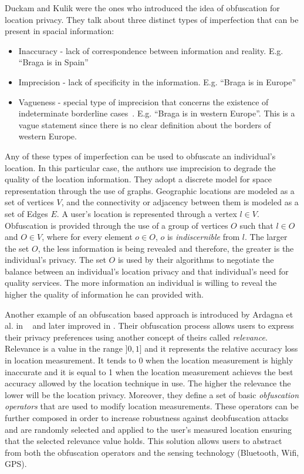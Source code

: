Duckam and Kulik
\cite{duckham2005formal} were the ones who introduced the idea of
obfuscation for location privacy. They talk about three distinct types of
imperfection that can be present in spacial information:
\begin{itemize}
\item Inaccuracy - lack of correspondence between information and
  reality. E.g. ``Braga is in Spain''
\item Imprecision - lack of specificity in the information. E.g.
  ``Braga is in Europe''
\item Vagueness - special type of imprecision that concerns the
  existence of indeterminate borderline
  cases~\cite{duckham2001formal}. E.g. ``Braga is in western Europe''.
  This is a vague statement since there is no clear definition about
  the borders of western Europe.
\end{itemize}

Any of these types of imperfection can be used to obfuscate an
individual's location. In this particular case, the authors use
imprecision to degrade the quality of the location information.
They adopt a discrete model for space representation through the use of
graphs. Geographic locations are modeled as a set of vertices $V$, and
the connectivity or adjacency between them is modeled as a set of
Edges $E$. A user's location is represented through a
vertex $l \in V$. Obfuscation is provided through the use of a group
of vertices $O$ such that $l \in O$ and $O \in V$, where for every
element $o \in O$, $o$ is \emph{indiscernible} from $l$. The larger
the set $O$, the less information is being revealed and therefore, the
greater is the individual's privacy. The set $O$ is used by their
algorithms to negotiate the balance between an individual's location
privacy and that individual's need for quality services. The more
information an individual is willing to reveal the higher the quality
of information he can provided with.

Another example of an obfuscation based approach is introduced by
Ardagna et al. in ~\cite{ardagna2007middleware} and later improved in
\cite{ardagna2007location, ardagna2011obfuscation}. Their obfuscation
process allows users to express their privacy preferences using
another concept of theirs called \emph{relevance}. Relevance is a
value in the range $]0,1]$ and it represents the relative accuracy
loss in location measurement. It tends to 0 when the location
measurement is highly inaccurate and it is equal to 1 when the
location measurement achieves the best accuracy allowed by the
location technique in use. The higher the relevance the lower will be the
location privacy. Moreover, they define a set of basic
\emph{obfuscation operators} that are used to modify location
measurements. These operators can be further composed in order to
increase robustness against deobfuscation attacks and are
randomly selected and applied to the user's measured location ensuring
that the selected relevance value holds. This solution allows users to
abstract from both the obfuscation operators and the sensing
technology (Bluetooth, Wifi, GPS).

